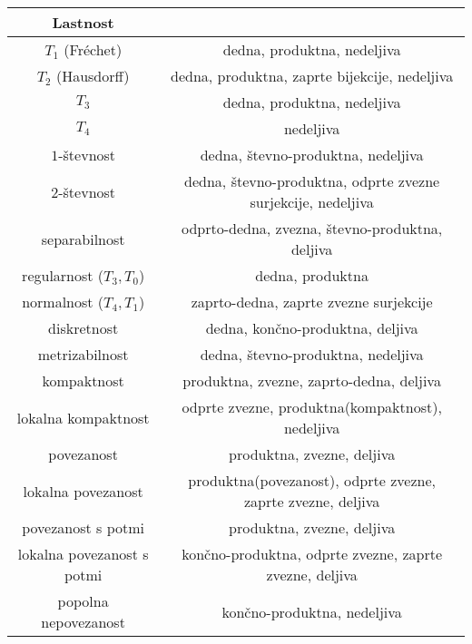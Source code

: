 \documentclass[10pt,a4paper]{article}
\begin{document}
\begin{table}[htbp]
    \begin{tabular}{|c|c|}
    \hline

    Lastnost &  \\ \hline \hline
    $T_1$ (Fréchet) & dedna, produktna, nedeljiva \\ \hline
    $T_2$ (Hausdorff) & dedna, produktna, zaprte bijekcije, nedeljiva \\ \hline
    $T_3$ & dedna, produktna, nedeljiva \\ \hline
    $T_4$ & nedeljiva \\ \hline
    $1$-števnost & dedna, števno-produktna, nedeljiva \\ \hline
    $2$-števnost & dedna, števno-produktna, odprte zvezne surjekcije, nedeljiva \\ \hline
    separabilnost & odprto-dedna, zvezna, števno-produktna, deljiva \\ \hline
    regularnost ($T_3, T_0$) & dedna, produktna \\ \hline
    normalnost ($T_4, T_1$) & zaprto-dedna, zaprte zvezne surjekcije \\ \hline
    diskretnost & dedna, končno-produktna, deljiva \\ \hline
    metrizabilnost & dedna, števno-produktna, nedeljiva \\ \hline
    kompaktnost & produktna, zvezne, zaprto-dedna, deljiva \\ \hline
    lokalna kompaktnost & odprte zvezne, produktna(kompaktnost), nedeljiva \\ \hline
    povezanost & produktna, zvezne, deljiva \\ \hline
    lokalna povezanost & produktna(povezanost), odprte zvezne, zaprte zvezne, deljiva\\ \hline
    povezanost s potmi & produktna, zvezne, deljiva \\ \hline
    lokalna povezanost s potmi & končno-produktna, odprte zvezne, zaprte zvezne, deljiva \\ \hline
    popolna nepovezanost & končno-produktna, nedeljiva \\ \hline
    \end{tabular}
    \end{table}
\end{document}
